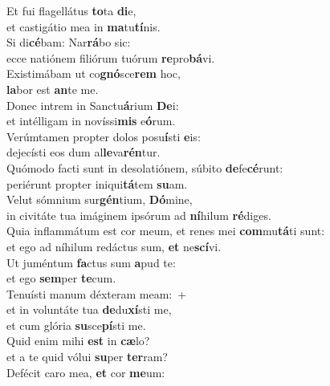 \evenverse Et fui flagellátus \textbf{to}ta \textbf{di}e,~\*\\
\evenverse et castigátio mea in \textbf{ma}tu\textbf{tí}nis.\\
\oddverse Si di\textbf{cé}bam: Nar\textbf{rá}bo sic:~\*\\
\oddverse ecce natiónem filiórum tuórum \textbf{re}pro\textbf{bá}vi.\\
\evenverse Existimábam ut co\textbf{gnó}sce\textbf{rem} hoc,~\*\\
\evenverse \textbf{la}bor est \textbf{an}te me.\\
\oddverse Donec intrem in Sanctu\textbf{á}rium \textbf{De}i:~\*\\
\oddverse et intélligam in novíssi\textbf{mis} e\textbf{ó}rum.\\
\evenverse Verúmtamen propter dolos posu\textbf{í}sti \textbf{e}is:~\*\\
\evenverse dejecísti eos dum al\textbf{le}va\textbf{rén}tur.\\
\oddverse Quómodo facti sunt in desolatiónem, súbito \textbf{de}fe\textbf{cé}runt:~\*\\
\oddverse periérunt propter iniqui\textbf{tá}tem \textbf{su}am.\\
\evenverse Velut sómnium sur\textbf{gén}tium, \textbf{Dó}mine,~\*\\
\evenverse in civitáte tua imáginem ipsórum ad \textbf{ní}hilum \textbf{ré}diges.\\
\oddverse Quia inflammátum est cor meum, et renes mei \textbf{com}mu\textbf{tá}ti sunt:~\*\\
\oddverse et ego ad níhilum redáctus sum, \textbf{et} ne\textbf{scí}vi.\\
\evenverse Ut juméntum \textbf{fa}ctus sum \textbf{a}pud te:~\*\\
\evenverse et ego \textbf{sem}per \textbf{te}cum.\\
\oddverse Tenuísti manum déxteram meam:~+\\
\oddverse  et in voluntáte tua \textbf{de}du\textbf{xí}sti me,~\*\\
\oddverse et cum glória \textbf{su}sce\textbf{pí}sti me.\\
\evenverse Quid enim mihi \textbf{est} in \textbf{cæ}lo?~\*\\
\evenverse et a te quid vólui \textbf{su}per \textbf{ter}ram?\\
\oddverse Defécit caro mea, \textbf{et} cor \textbf{me}um:~\*\\
